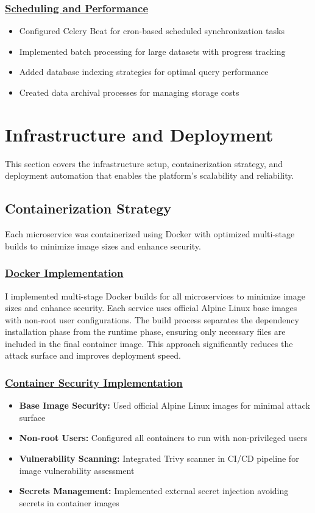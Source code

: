 \subsubsection*{\underline{Scheduling and Performance}}
\begin{itemize}
    \item Configured Celery Beat for cron-based scheduled synchronization tasks
    \item Implemented batch processing for large datasets with progress tracking
    \item Added database indexing strategies for optimal query performance
    \item Created data archival processes for managing storage costs
\end{itemize}

\section{Infrastructure and Deployment}
This section covers the infrastructure setup, containerization strategy, and deployment automation that enables the platform's scalability and reliability.

\subsection{Containerization Strategy}
Each microservice was containerized using Docker with optimized multi-stage builds to minimize image sizes and enhance security.

\subsubsection*{\underline{Docker Implementation}}
I implemented multi-stage Docker builds for all microservices to minimize image sizes and enhance security. Each service uses official Alpine Linux base images with non-root user configurations. The build process separates the dependency installation phase from the runtime phase, ensuring only necessary files are included in the final container image. This approach significantly reduces the attack surface and improves deployment speed.

\subsubsection*{\underline{Container Security Implementation}}
\begin{itemize}
    \item \textbf{Base Image Security:} Used official Alpine Linux images for minimal attack surface
    \item \textbf{Non-root Users:} Configured all containers to run with non-privileged users
    \item \textbf{Vulnerability Scanning:} Integrated Trivy scanner in CI/CD pipeline for image vulnerability assessment
    \item \textbf{Secrets Management:} Implemented external secret injection avoiding secrets in container images
\end{itemize}

